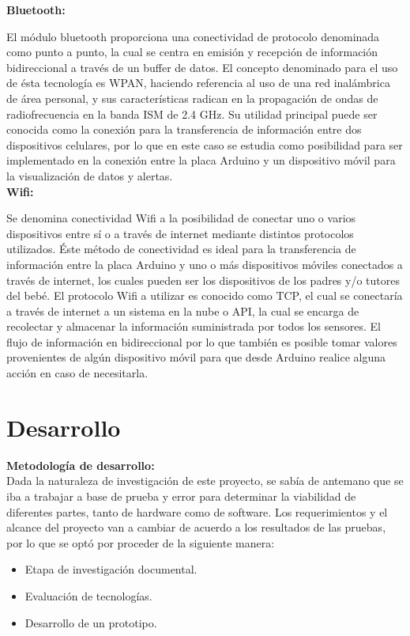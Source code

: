 \documentclass{IEEEtran}
\begin{document}
		    \textbf{Bluetooth:}
		
				El módulo bluetooth proporciona una conectividad de protocolo denominada como punto a punto, la cual se centra en emisión y recepción de información bidireccional a través de un buffer de datos. 
				El concepto denominado para el uso de ésta tecnología es WPAN, haciendo referencia al uso de una red inalámbrica de área personal, y sus características radican en la propagación de ondas de radiofrecuencia en la banda ISM de 2.4 GHz. 
				Su utilidad principal puede ser conocida como la conexión para la transferencia de información entre dos dispositivos celulares, por lo que en este caso se estudia como posibilidad para ser implementado en la conexión entre la placa Arduino y un dispositivo móvil para la visualización de datos y alertas.\\

			    \textbf{Wifi:}
				
				Se denomina conectividad Wifi a la posibilidad de conectar uno o varios dispositivos entre sí o a través de internet mediante distintos protocolos utilizados. Éste método de conectividad es ideal para la transferencia de información entre la placa Arduino y uno o más dispositivos móviles conectados a través de internet, los cuales pueden ser los dispositivos de los padres y/o tutores del bebé. 
				El protocolo Wifi a utilizar es conocido como TCP, el cual se conectaría a través de internet a un sistema en la nube o API, la cual se encarga de recolectar y almacenar la información suministrada por todos los sensores. El flujo de información en bidireccional por lo que también es posible tomar valores provenientes de algún dispositivo móvil para que desde Arduino realice alguna acción en caso de necesitarla.

	\section{Desarrollo}

		\textbf{Metodología de desarrollo:}\\
Dada la naturaleza de investigación de este proyecto, se sabía de antemano que se iba a trabajar a base de prueba y error para determinar la viabilidad de diferentes partes, tanto de hardware como de software. Los requerimientos y el alcance del proyecto van a cambiar de acuerdo a los resultados de las pruebas, por lo que se optó por proceder de la siguiente manera:

\begin{itemize}
    \item Etapa de investigación documental.
    \item Evaluación de tecnologías.
    \item Desarrollo de un prototipo.
\end{itemize}
\end{document}
